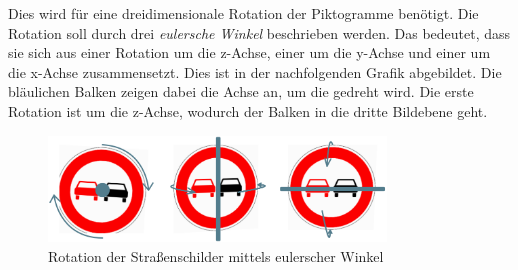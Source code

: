Dies wird für eine dreidimensionale Rotation der Piktogramme benötigt. Die Rotation soll durch drei \emph{eulersche Winkel} beschrieben werden. Das bedeutet, dass sie sich aus einer Rotation um die z-Achse, einer um die y-Achse und einer um die x-Achse zusammensetzt. Dies ist in der nachfolgenden Grafik abgebildet. Die bläulichen Balken zeigen dabei die Achse an, um die gedreht wird. Die erste Rotation ist um die z-Achse, wodurch der Balken in die dritte Bildebene geht. \cite{math-primer}

\begin{figure}[H]
	\centering
	\includegraphics[width=0.8\textwidth]{../images/3 Konzeption des Generative Adversarial Networks/Datenaugmentation/Rotation.png}
	\caption{Rotation der Straßenschilder mittels eulerscher Winkel}
	\label{fig:rotation}
\end{figure}


